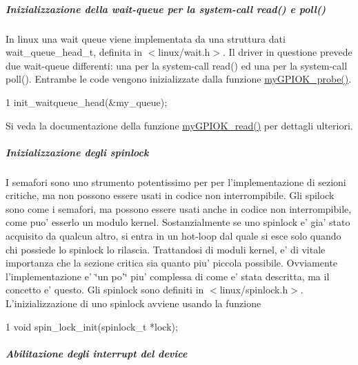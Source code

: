 \subparagraph*{Inizializzazione della wait-\/queue per la system-\/call read() e poll()}

In linux una wait queue viene implementata da una struttura dati wait\+\_\+queue\+\_\+head\+\_\+t, definita in $<$linux/wait.\+h$>$. Il driver in questione prevede due wait-\/queue differenti\+: una per la system-\/call read() ed una per la system-\/call poll(). Entrambe le code vengono inizializzate dalla funzione \hyperlink{group___linux-_driver_gae40973a06d72f7c41a9af07513a62307}{my\+G\+P\+I\+O\+K\+\_\+probe()}. 
\begin{DoxyCode}
1 init\_waitqueue\_head(&my\_queue);
\end{DoxyCode}
 Si veda la documentazione della funzione \hyperlink{group___linux-_driver_ga90ac339df9c02ae5f11a2a7727adc923}{my\+G\+P\+I\+O\+K\+\_\+read()} per dettagli ulteriori.

\subparagraph*{Inizializzazione degli spinlock}

I semafori sono uno strumento potentissimo per per l'implementazione di sezioni critiche, ma non possono essere usati in codice non interrompibile. Gli spilock sono come i semafori, ma possono essere usati anche in codice non interrompibile, come puo' esserlo un modulo kernel. Sostanzialmente se uno spinlock e' gia' stato acquisito da qualcun altro, si entra in un hot-\/loop dal quale si esce solo quando chi possiede lo spinlock lo rilascia. Trattandosi di moduli kernel, e' di vitale importanza che la sezione critica sia quanto piu' piccola possibile. Ovviamente l'implementazione e' \char`\"{}un po'\char`\"{} piu' complessa di come e' stata descritta, ma il concetto e' questo. Gli spinlock sono definiti in $<$linux/spinlock.\+h$>$. L'inizializzazione di uno spinlock avviene usando la funzione 
\begin{DoxyCode}
1 void spin\_lock\_init(spinlock\_t *lock);
\end{DoxyCode}


\subparagraph*{Abilitazione degli interrupt del device}

